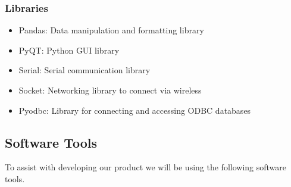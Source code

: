 \documentclass[12pt,titlepage]{article}
\begin{document}
\subsubsection{Libraries}
\begin{itemize}
	\item Pandas: Data manipulation and formatting library
	\item PyQT: Python GUI library
	\item Serial: Serial communication library
	\item Socket: Networking library to connect via wireless
	\item Pyodbc: Library for connecting and accessing ODBC databases
\end{itemize}

\newpage
\subsection{Software Tools}
To assist with developing our product we will be using the following software tools.
\end{document}
